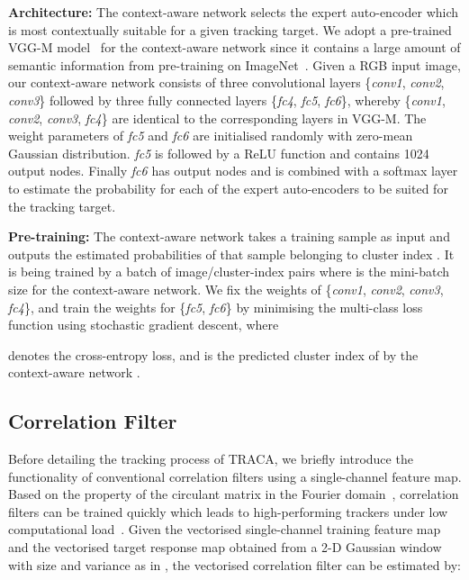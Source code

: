 \documentclass[10pt,twocolumn,letterpaper]{article}
\begin{document}
\textbf{Architecture:}
The context-aware network selects the expert auto-encoder which is most contextually suitable for a given tracking target.
We adopt a pre-trained VGG-M model~\cite{ref:vggm} for the context-aware network since it contains a large amount of semantic information from pre-training on ImageNet~\cite{ref:ImageNet}. 
Given a  RGB input image, our context-aware network consists of three convolutional layers \{\textit{conv1}, \textit{conv2}, \textit{conv3}\} followed by three fully connected layers \{\textit{fc4}, \textit{fc5}, \textit{fc6}\}, whereby \{\textit{conv1}, \textit{conv2}, \textit{conv3}, \textit{fc4}\} are identical to the corresponding layers in VGG-M. 
The weight parameters of \textit{fc5} and \textit{fc6} are initialised randomly with zero-mean Gaussian distribution. 
\textit{fc5} is followed by a ReLU function and contains 1024 output nodes. 
Finally \textit{fc6} has  output nodes and is combined with a softmax layer to estimate the probability for each of the expert auto-encoders to be suited for the tracking target.


\textbf{Pre-training:}
The context-aware network takes a training sample  as input and outputs the estimated probabilities of that sample belonging to cluster index .
It is being trained by a batch  of image/cluster-index pairs where  is the mini-batch size for the context-aware network.
We fix the weights of \{\textit{conv1}, \textit{conv2}, \textit{conv3}, \textit{fc4}\}, and train the weights for \{\textit{fc5}, \textit{fc6}\} by minimising the multi-class loss function  using stochastic gradient descent, where
\small
\vspace{-2mm}

\normalsize
 denotes the cross-entropy loss, and  is the predicted cluster index of  by the context-aware network .

 \subsection{Correlation Filter} \label{sec:correlationfilter}
Before detailing the tracking process of TRACA, we briefly introduce the functionality of conventional correlation filters using a single-channel feature map.
Based on the property of the circulant matrix in the Fourier domain~\cite{ref:cirMatrix}, correlation filters can be trained quickly which leads to high-performing trackers under low computational load~\cite{ref:KCF}. 
Given the vectorised single-channel training feature map  
and the vectorised target response map  obtained from a 2-D Gaussian window with size  and variance  as in \cite{ref:KCF}, the vectorised correlation filter  can be estimated by:
\end{document}
